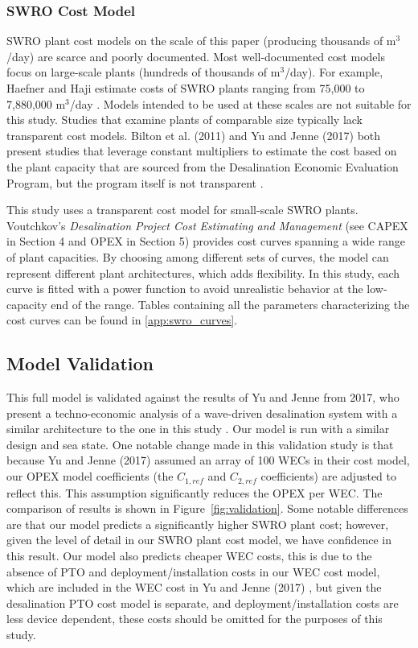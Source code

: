 \documentclass[a4paper,12pt]{elsarticle}
\begin{document}
\subsubsection{SWRO Cost Model}
SWRO plant cost models on the scale of this paper (producing thousands of m$^3$/day) are scarce and poorly documented. Most well-documented cost models focus on large-scale plants (hundreds of thousands of m$^3$/day). For example, Haefner and Haji estimate costs of SWRO plants ranging from 75,000 to 7,880,000 m$^3$/day \cite{Haefner2023}. Models intended to be used at these scales are not suitable for this study. Studies that examine plants of comparable size typically lack transparent cost models. Bilton et al. (2011) \cite{Bilton2011} and Yu and Jenne (2017) \cite{YJecon2017} both present studies that leverage constant multipliers to estimate the cost based on the plant capacity that are sourced from the Desalination Economic Evaluation Program, but the program itself is not transparent \cite{DEEP5manual}.

This study uses a transparent cost model for small-scale SWRO plants. Voutchkov’s \emph{Desalination Project Cost Estimating and Management} \cite{voutch} (see CAPEX in Section 4 and OPEX in Section 5) provides cost curves spanning a wide range of plant capacities. By choosing among different sets of curves, the model can represent different plant architectures, which adds flexibility. In this study, each curve is fitted with a power function to avoid unrealistic behavior at the low-capacity end of the range. Tables containing all the parameters characterizing the cost curves can be found in \ref{app:swro_curves}.

\subsection{Model Validation}
This full model is validated against the results of Yu and Jenne from 2017, who present a techno-economic analysis of a wave-driven desalination system with a similar architecture to the one in this study \cite{YJecon2017}. Our model is run with a similar design and sea state. One notable change made in this validation study is that because Yu and Jenne (2017) \cite{YJecon2017} assumed an array of 100 WECs in their cost model, our OPEX model coefficients (the $C_{1,ref}$ and $C_{2,ref}$ coefficients) are adjusted to reflect this. This assumption significantly reduces the OPEX per WEC. The comparison of results is shown in Figure~\ref{fig:validation}. Some notable differences are that our model predicts a significantly higher SWRO plant cost; however, given the level of detail in our SWRO plant cost model, we have confidence in this result. Our model also predicts cheaper WEC costs, this is due to the absence of PTO and deployment/installation costs in our WEC cost model, which are included in the WEC cost in Yu and Jenne (2017) \cite{YJecon2017}, but given the desalination PTO cost model is separate, and deployment/installation costs are less device dependent, these costs should be omitted for the purposes of this study. 
\end{document}
